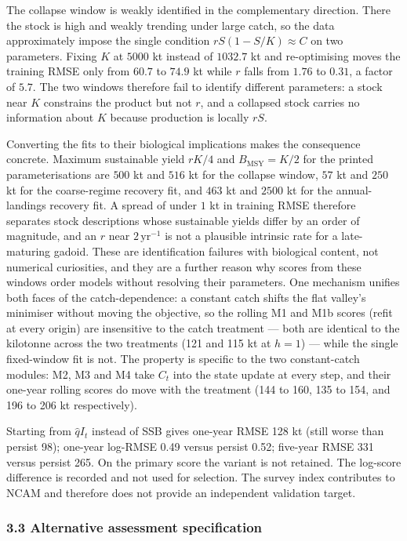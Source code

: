 \documentclass[11pt]{article}
\begin{document}
The collapse window is weakly identified in the complementary direction.
There the stock is high and weakly trending under large catch, so the
data approximately impose the single condition \(rS(1-S/K)\approx C\) on
two parameters. Fixing \(K\) at \(5000\) kt instead of \(1032.7\) kt and
re-optimising moves the training RMSE only from \(60.7\) to \(74.9\) kt
while \(r\) falls from \(1.76\) to \(0.31\), a factor of \(5.7\). The
two windows therefore fail to identify different parameters: a stock
near \(K\) constrains the product but not \(r\), and a collapsed stock
carries no information about \(K\) because production is locally
\(rS\).

Converting the fits to their biological implications makes the
consequence concrete. Maximum sustainable yield \(rK/4\) and
\(B_{\mathrm{MSY}} = K/2\) for the printed parameterisations are
\(500\) kt and \(516\) kt for the collapse window, \(57\) kt and
\(250\) kt for the coarse-regime recovery fit, and \(463\) kt and
\(2500\) kt for the annual-landings recovery fit. A spread of under
\(1\) kt in training RMSE therefore separates stock descriptions whose
sustainable yields differ by an order of magnitude, and an \(r\) near
\(2\,\mathrm{yr}^{-1}\) is not a plausible intrinsic rate for a
late-maturing gadoid. These are identification failures with biological
content, not numerical curiosities, and they are a further reason why
scores from these windows order models without resolving their
parameters. One mechanism
unifies both faces of the catch-dependence: a constant catch shifts the
flat valley's minimiser without moving the objective, so the rolling
M1 and M1b scores (refit at every origin) are insensitive to the catch
treatment --- both are identical to the kilotonne across the two
treatments (121 and 115 kt at \(h=1\)) --- while the single
fixed-window fit is not. The property is specific to the two
constant-catch modules: M2, M3 and M4 take \(C_t\) into the state
update at every step, and their one-year rolling scores do move with the
treatment (144 to 160, 135 to 154, and 196 to 206 kt respectively).

Starting from \(\hat q I_t\) instead of SSB gives one-year RMSE 128 kt
(still worse than persist 98); one-year log-RMSE 0.49 versus persist
0.52; five-year RMSE 331 versus persist 265. On the primary score the
variant is not retained. The log-score difference is recorded and not
used for selection. The survey index contributes to NCAM and therefore
does not provide an independent validation target.

\subsubsection{3.3 Alternative assessment
specification}\label{alternative-assessment-specification}
\end{document}
